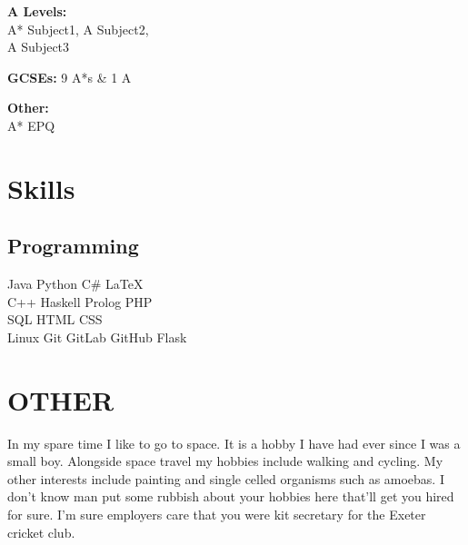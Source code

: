         \vspace{0.2cm}
        \textbf{A Levels:}\\
        A* Subject1, A Subject2, \\A Subject3\\

        \sectionspace %

        \textbf{GCSEs:} 9 A*s & 1 A\\

        \sectionspace %

        \textbf{Other:}\\
        A* EPQ 

\sectionspace %

\section{Skills}

    \subsection{Programming}
        Java \textbullet{} Python \textbullet{} C# \textbullet{} \LaTeX\ \\ 
        C++ \textbullet{} Haskell \textbullet{} Prolog \textbullet{} PHP\\ \textbullet{} SQL \textbullet{} HTML \textbullet{} CSS \\
        Linux \textbullet{} Git \textbullet{} GitLab \textbullet{} GitHub \textbullet{} Flask

\sectionspace %

\section{OTHER}
    In my spare time I like to go to space. It is a hobby I have had ever since I was a small boy.
    Alongside space travel my hobbies include walking and cycling. My other interests include 
    painting and single celled organisms such as amoebas. I don't know man put some rubbish
    about your hobbies here that'll get you hired for sure. I'm sure employers care that you were kit
    secretary for the Exeter cricket club.
